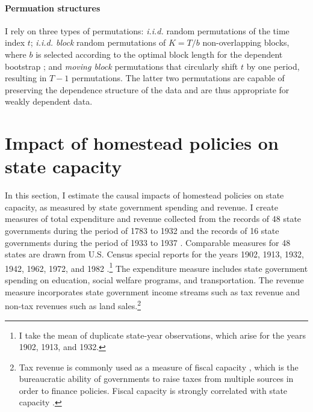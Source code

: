 \documentclass[12pt]{article}
\begin{document}
\paragraph{Permuation structures}I rely on three types of permutations: \emph{i.i.d.} random permutations of the time index $t$; \emph{i.i.d. block} random permutations of $K=T/b$ non-overlapping blocks, where $b$ is selected according to the optimal block length for the dependent bootstrap \citep{politis2004automatic}; and \emph{moving block} permutations that circularly shift $t$ by one period, resulting in $T-1$ permutations. The latter two permutations are capable of preserving the dependence structure of the data and are thus appropriate for weakly dependent data. 


\section{Impact of homestead policies on state capacity} \label{state-capacity}

In this section, I estimate the causal impacts of homestead policies on state capacity, as measured by state government spending and revenue. I create measures of total expenditure and revenue collected from the records of 48 state governments during the period of 1783 to 1932 \citep{sylla1993sources} and the records of 16 state governments during the period of 1933 to 1937 \citep{sylla1995sourcesa,sylla1995sourcesb}. Comparable measures for 48 states are drawn from U.S. Census special reports for the years 1902, 1913, 1932, 1942, 1962, 1972, and 1982 \citep{haines2010}.\footnote{I take the mean of duplicate state-year observations, which arise for the years 1902, 1913, and 1932.} The expenditure measure includes state government spending on education, social welfare programs, and transportation. The revenue measure incorporates state government income streams such as tax revenue and non-tax revenues such as land sales.\footnote{Tax revenue is commonly used as a measure of fiscal capacity \citep{lieberman2002taxation}, which is the bureaucratic ability of governments to raise taxes from multiple sources in order to finance policies. Fiscal capacity is strongly correlated with state capacity \citep{besley2010state}.} 
\end{document}
